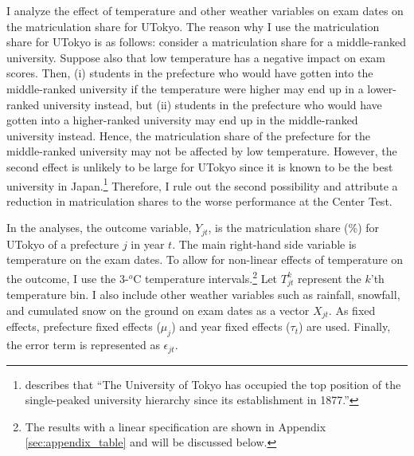 \documentclass[12pt,letterpaper]{article}
\begin{document}
I analyze the effect of temperature and other weather variables on exam dates on the matriculation share for UTokyo.
The reason why I use the matriculation share for UTokyo is as follows:
consider a matriculation share for a middle-ranked university.
Suppose also that low temperature has a negative impact on exam scores.
Then, 
(i) students in the prefecture who would have gotten into the middle-ranked university if the temperature were higher may end up in a lower-ranked university instead, but
(ii) students in the prefecture who would have gotten into a higher-ranked university may end up in the middle-ranked university instead.
Hence, the matriculation share of the prefecture for the middle-ranked university may not be affected by low temperature.
However, the second effect is unlikely to be large for UTokyo since it is known to be the best university in Japan.\footnote{
  \citet{Kawaguchi2008} describes that ``The University of Tokyo has occupied the top position of the single-peaked university hierarchy since its establishment in 1877.''
}
Therefore, I rule out the second possibility and attribute a reduction in matriculation shares to the worse performance at the Center Test.

In the analyses, the outcome variable, $Y_{jt}$, is the matriculation share (\%) for UTokyo of a prefecture $j$ in year $t$.
The main right-hand side variable is temperature on the exam dates.
To allow for non-linear effects of temperature on the outcome, I use the 3-$^o$C temperature intervals.\footnote{
  The results with a linear specification are shown in Appendix \ref{sec:appendix_table} and will be discussed below.
}
Let $T_{jt}^k$ represent the $k$'th temperature bin.
I also include other weather variables such as rainfall, snowfall, and cumulated snow on the ground on exam dates as a vector $X_{jt}$.
As fixed effects, prefecture fixed effects ($\mu_j$) and year fixed effects ($\tau_t$) are used.
Finally, the error term is represented as $\epsilon_{jt}$.
\end{document}
